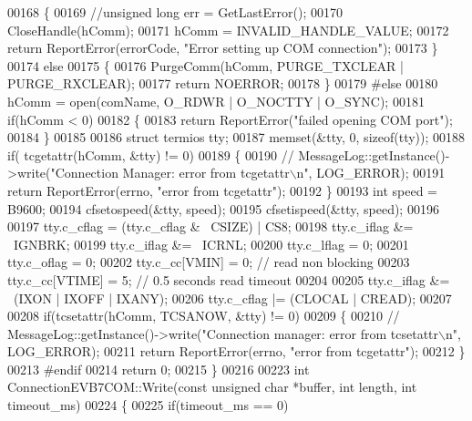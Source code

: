 \begin{DoxyCode}
00168     \{
00169         \textcolor{comment}{//unsigned long err = GetLastError();}
00170         CloseHandle(hComm);
00171         hComm = INVALID\_HANDLE\_VALUE;
00172         \textcolor{keywordflow}{return} ReportError(errorCode, \textcolor{stringliteral}{"Error setting up COM connection"});
00173     \}
00174     \textcolor{keywordflow}{else}
00175     \{
00176         PurgeComm(hComm, PURGE\_TXCLEAR | PURGE\_RXCLEAR);
00177         \textcolor{keywordflow}{return} NOERROR;
00178     \}
00179 \textcolor{preprocessor}{#else}
00180     hComm = open(comName, O\_RDWR | O\_NOCTTY | O\_SYNC);
00181     \textcolor{keywordflow}{if}(hComm < 0)
00182     \{
00183         \textcolor{keywordflow}{return} ReportError(\textcolor{stringliteral}{"failed opening COM port"});
00184     \}
00185 
00186     \textcolor{keyword}{struct }termios tty;
00187     memset(&tty, 0, \textcolor{keyword}{sizeof}(tty));
00188     \textcolor{keywordflow}{if}( tcgetattr(hComm, &tty) != 0)
00189     \{
00190 \textcolor{comment}{//        MessageLog::getInstance()->write("Connection Manager: error from tcgetattr\(\backslash\)n", LOG\_ERROR);}
00191         \textcolor{keywordflow}{return} ReportError(errno, \textcolor{stringliteral}{"error from tcgetattr"});
00192     \}
00193     \textcolor{keywordtype}{int} speed = B9600;
00194     cfsetospeed(&tty, speed);
00195     cfsetispeed(&tty, speed);
00196 
00197     tty.c\_cflag = (tty.c\_cflag & ~CSIZE) | CS8;
00198     tty.c\_iflag &= ~IGNBRK;
00199     tty.c\_iflag &= ~ICRNL;
00200     tty.c\_lflag = 0;
00201     tty.c\_oflag = 0;
00202     tty.c\_cc[VMIN] = 0; \textcolor{comment}{// read non blocking}
00203     tty.c\_cc[VTIME] = 5; \textcolor{comment}{// 0.5 seconds read timeout}
00204 
00205     tty.c\_iflag &= ~(IXON | IXOFF | IXANY);
00206     tty.c\_cflag |= (CLOCAL | CREAD);
00207 
00208     \textcolor{keywordflow}{if}(tcsetattr(hComm, TCSANOW, &tty) != 0)
00209     \{
00210 \textcolor{comment}{//        MessageLog::getInstance()->write("Connection manager: error from tcsetattr\(\backslash\)n", LOG\_ERROR);}
00211         \textcolor{keywordflow}{return} ReportError(errno, \textcolor{stringliteral}{"error from tcgetattr"});
00212     \}
00213 \textcolor{preprocessor}{#endif}
00214     \textcolor{keywordflow}{return} 0;
00215 \}
00216 
00223 \textcolor{keywordtype}{int} ConnectionEVB7COM::Write(\textcolor{keyword}{const} \textcolor{keywordtype}{unsigned} \textcolor{keywordtype}{char} *buffer, \textcolor{keywordtype}{int} length, \textcolor{keywordtype}{int} 
      timeout_ms)
00224 \{
00225     \textcolor{keywordflow}{if}(timeout\_ms == 0)

\end{DoxyCode}
